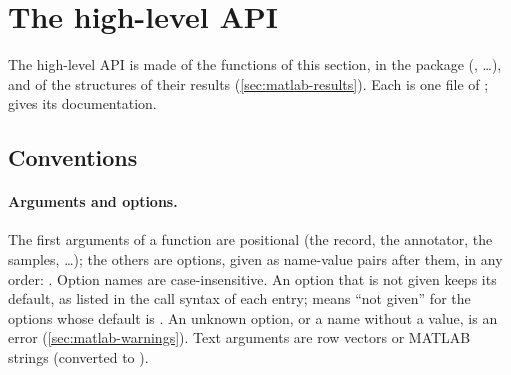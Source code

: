 \section{The high-level API}
\label{sec:matlab-api}

The high-level API is made of the functions of this section, in the package
 (, \ldots), and of the structures of their results
(\cref{sec:matlab-results}). Each is one file of ;
 gives its documentation.

\subsection{Conventions}
\label{sec:matlab-conventions}

\paragraph{Arguments and options.} The first arguments of a function are positional (the
record, the annotator, the samples, \ldots); the others are options, given as name-value
pairs after them, in any order: . Option names are case-insensitive. An option that is not given keeps
its default, as listed in the call syntax of each entry; \code{[]} means ``not given'' for
the options whose default is \code{[]}. An unknown option, or a name without a value, is
an error (\cref{sec:matlab-warnings}). Text arguments are  row vectors or
MATLAB strings (converted to ).

